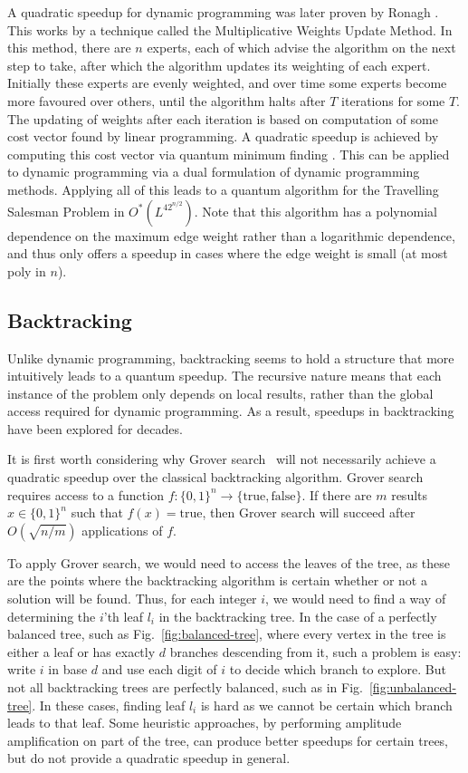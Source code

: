 A quadratic speedup for dynamic programming was later proven by Ronagh \cite{ronagh2019}. This works by a technique called the Multiplicative Weights Update Method. In this method, there are $n$ experts, each of which advise the algorithm on the next step to take, after which the algorithm updates its weighting of each expert. Initially these experts are evenly weighted, and over time some experts become more favoured over others, until the algorithm halts after $T$ iterations for some $T$. The updating of weights after each iteration is based on computation of some cost vector found by linear programming. A quadratic speedup is achieved by computing this cost vector via quantum minimum finding \cite{durr1996}. This can be applied to dynamic programming via a dual formulation of dynamic programming methods. Applying all of this leads to a quantum algorithm for the Travelling Salesman Problem in $O^*(L^42^{n/2})$. Note that this algorithm has a polynomial dependence on the maximum edge weight rather than a logarithmic dependence, and thus only offers a speedup in cases where the edge weight is small (at most poly in $n$).

\subsection{Backtracking}
\label{sec:q-backtrack}

Unlike dynamic programming, backtracking seems to hold a structure that more intuitively leads to a quantum speedup. The recursive nature means that each instance of the problem only depends on local results, rather than the global access required for dynamic programming. As a result, speedups in backtracking have been explored for decades.

It is first worth considering why Grover search~\cite{grover96} will not necessarily achieve a quadratic speedup over the classical backtracking algorithm. Grover search requires access to a function $f \colon \{0,1\}^n \rightarrow \{\text{true}, \text{false}\}$. If there are $m$ results $x \in \{0,1\}^n$ such that $f(x) = \text{true}$, then Grover search will succeed after $O(\sqrt{n/m})$ applications of $f$\cite{grover96}.

To apply Grover search, we would need to access the leaves of the tree, as these are the points where the backtracking algorithm is certain whether or not a solution will be found. Thus, for each integer $i$, we would need to find a way of determining the $i$'th leaf $l_i$ in the backtracking tree. In the case of a perfectly balanced tree, such as Fig.\ \ref{fig:balanced-tree}, where every vertex in the tree is either a leaf or has exactly $d$ branches descending from it, such a problem is easy: write $i$ in base $d$ and use each digit of $i$ to decide which branch to explore. But not all backtracking trees are perfectly balanced, such as in Fig.\ \ref{fig:unbalanced-tree}. In these cases, finding leaf $l_i$ is hard as we cannot be certain which branch leads to that leaf. Some heuristic approaches, by performing amplitude amplification on part of the tree, can produce better speedups for certain trees, but do not provide a quadratic speedup in general.


